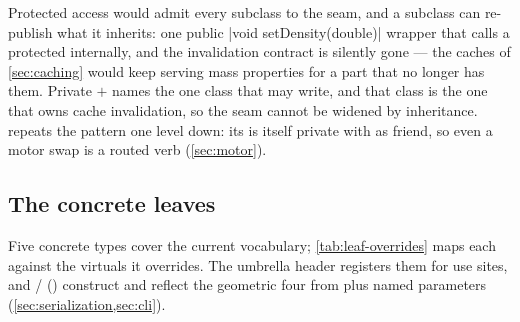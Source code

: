\begin{rejected}
Protected access would admit every subclass to the seam, and a subclass can re-publish what it
inherits: one public \cppinline|void setDensity(double)| wrapper that calls a protected
 internally, and the invalidation contract is silently gone --- the caches of
\cref{sec:caching} would keep serving mass properties for a part that no longer has them. Private
$+$  names the one class that may write, and that class is the one that owns cache
invalidation, so the seam cannot be widened by inheritance.  repeats the pattern one
level down: its  is itself private with  as friend, so even a
motor swap is a routed verb (\cref{sec:motor}).
\end{rejected}

\subsection{The concrete leaves}\label{sec:leaf-concrete}

Five concrete types cover the current vocabulary; \cref{tab:leaf-overrides} maps each against the
virtuals it overrides. The umbrella header  registers them for use
sites, and / () construct and reflect
the geometric four from  plus named parameters (\cref{sec:serialization,sec:cli}).

